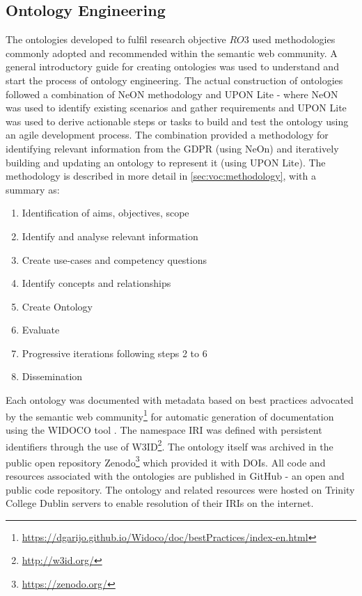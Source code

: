 \subsection{Ontology Engineering}\label{sec:intro:ontology-engineering}
The ontologies developed to fulfil research objective $RO3$ used methodologies commonly adopted and recommended within the semantic web community. A general introductory guide for creating ontologies \cite{noy_ontology_2001} was used to understand and start the process of ontology engineering.
The actual construction of ontologies followed a combination of NeON methodology \cite{suarez-figueroa_neon_2012} and UPON Lite \cite{de_nicola_lightweight_2016} - where NeON was used to identify existing scenarios and gather requirements and UPON Lite was used to derive actionable steps or tasks to build and test the ontology using an agile development process.
The combination provided a methodology for identifying relevant information from the GDPR (using NeOn) and iteratively building and updating an ontology to represent it (using UPON Lite).
The methodology is described in more detail in \autoref{sec:voc:methodology}, with a summary as:
\begin{enumerate}
	\item Identification of aims, objectives, scope
    \item Identify and analyse relevant information
    \item Create use-cases and competency questions
    \item Identify concepts and relationships
    \item Create Ontology
    \item Evaluate
    \item Progressive iterations following steps 2 to 6
    \item Dissemination
\end{enumerate}

Each ontology was documented with metadata based on best practices advocated by the semantic web community\footnote{\url{https://dgarijo.github.io/Widoco/doc/bestPractices/index-en.html}} for automatic generation of documentation using the WIDOCO tool \cite{garijo_widoco_2017}.
The namespace IRI was defined with persistent identifiers through the use of W3ID\footnote{\url{http://w3id.org/}}.
The ontology itself was archived in the public open repository Zenodo\footnote{\url{https://zenodo.org/}} which provided it with DOIs.
All code and resources associated with the ontologies are published in GitHub - an open and public code repository.
The ontology and related resources were hosted on Trinity College Dublin servers to enable resolution of their IRIs on the internet.

